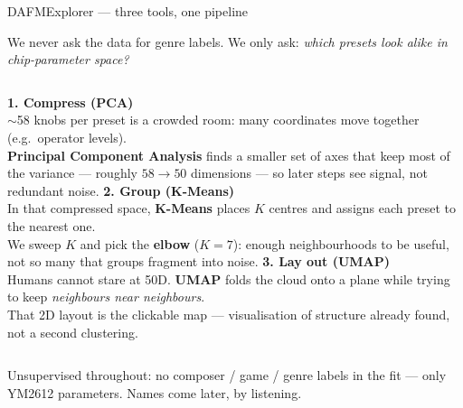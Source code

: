 \documentclass[aspectratio=169,11pt]{beamer}
\begin{document}
\begin{frame}{DAFMExplorer --- three tools, one pipeline}
  {\scriptsize
  We never ask the data for genre labels. We only ask: \emph{which presets look alike in chip-parameter space?}
  \vspace{1.5mm}
  \begin{columns}[T,onlytextwidth]
    \textbf{\color{kasserCyan}1. Compress (PCA)}\\[0.8mm]
    $\sim$58 knobs per preset is a crowded room: many coordinates move together (e.g.\ operator levels).\\[1mm]
    \textbf{Principal Component Analysis} finds a smaller set of axes that keep most of the variance --- roughly $58{\rightarrow}50$ dimensions --- so later steps see signal, not redundant noise.
    \textbf{\color{kasserMagenta}2. Group (K-Means)}\\[0.8mm]
    In that compressed space, \textbf{K-Means} places $K$ centres and assigns each preset to the nearest one.\\[1mm]
    We sweep $K$ and pick the \textbf{elbow} ($K{=}7$): enough neighbourhoods to be useful, not so many that groups fragment into noise.
    \textbf{\color{kasserGold}3. Lay out (UMAP)}\\[0.8mm]
    Humans cannot stare at 50D. \textbf{UMAP} folds the cloud onto a plane while trying to keep \emph{neighbours near neighbours}.\\[1mm]
    That 2D layout is the clickable map --- visualisation of structure already found, not a second clustering.
  \end{columns}
  \vspace{2mm}
  {\color{kasserMuted}Unsupervised throughout: no composer / game / genre labels in the fit --- only YM2612 parameters. Names come later, by listening.}
  }
\end{frame}
\end{document}

